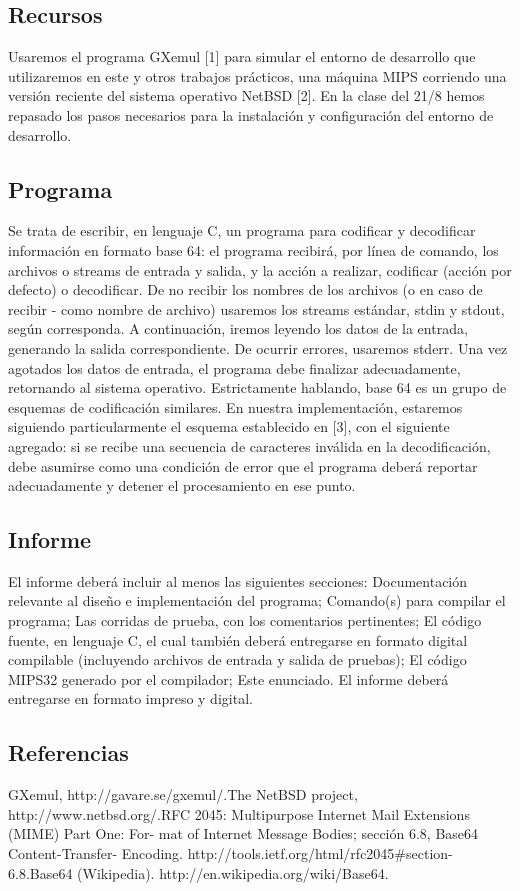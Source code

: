 \documentclass[a4paper,11pt, margin=1in]{article}
\begin{document}
\subsection{Recursos}
Usaremos el programa GXemul [1] para simular el entorno de desarrollo que
utilizaremos en este y otros trabajos prácticos, una máquina MIPS corriendo
una versión reciente del sistema operativo NetBSD [2].
En la clase del 21/8 hemos repasado los pasos necesarios para la instalación
y configuración del entorno de desarrollo.

\subsection{Programa}
Se trata de escribir, en lenguaje C, un programa para codificar y decodificar
información en formato base 64: el programa recibirá, por línea de comando, los archivos o streams de entrada y salida, y la acción a realizar, codificar (acción por defecto) o decodificar. De no recibir los nombres de los archivos (o
en caso de recibir - como nombre de archivo) usaremos los streams estándar,
stdin y stdout, según corresponda. A continuación, iremos leyendo los datos
de la entrada, generando la salida correspondiente. De ocurrir errores, usaremos stderr. Una vez agotados los datos de entrada, el programa debe finalizar
adecuadamente, retornando al sistema operativo.
Estrictamente hablando, base 64 es un grupo de esquemas de codificación
similares. En nuestra implementación, estaremos siguiendo particularmente el
esquema establecido en [3], con el siguiente agregado: si se recibe una secuencia
de caracteres inválida en la decodificación, debe asumirse como una condición
de error que el programa deberá reportar adecuadamente y detener el procesamiento en ese punto.

\subsection{Informe}
El informe deberá incluir al menos las siguientes secciones:
Documentación relevante al diseño e implementación del programa;
Comando(s) para compilar el programa;
Las corridas de prueba, con los comentarios pertinentes;
El código fuente, en lenguaje C, el cual también deberá entregarse en
formato digital compilable (incluyendo archivos de entrada y salida de
pruebas);
El código MIPS32 generado por el compilador;
Este enunciado.
El informe deberá entregarse en formato impreso y digital.

\subsection{Referencias}
\begin{flushleft}
[1] GXemul, http://gavare.se/gxemul/.\break
[2] The NetBSD project, http://www.netbsd.org/.\break
[3] RFC 2045: Multipurpose Internet Mail Extensions (MIME) Part One: For-
mat of Internet Message Bodies; sección 6.8, Base64 Content-Transfer-
Encoding. http://tools.ietf.org/html/rfc2045\#section-6.8.\break
[4] Base64 (Wikipedia). http://en.wikipedia.org/wiki/Base64.
\end{flushleft}
\end{document}
